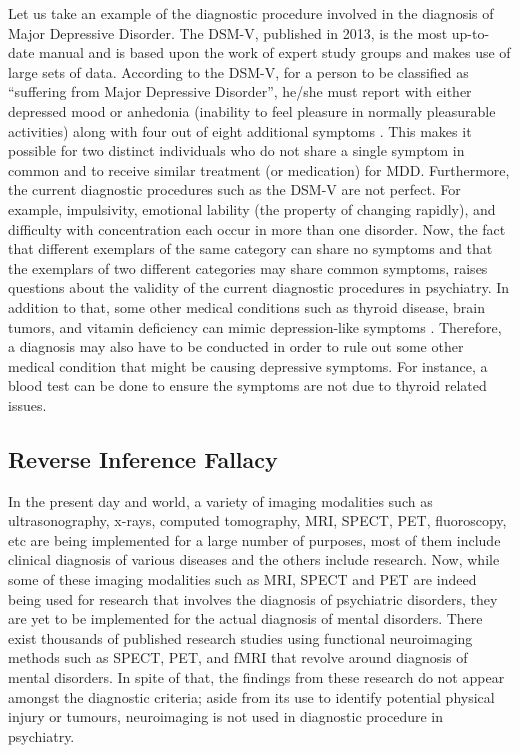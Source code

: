 \documentclass[12pt]{article}
\begin{document}
Let us take an example of the diagnostic procedure involved in the
diagnosis of Major Depressive Disorder. The DSM-V, published in 2013,
is the most up-to-date manual and is based upon the work of expert
study groups and makes use of large sets of data. According to the
DSM-V, for a person to be classified as ``suffering from Major
Depressive Disorder'', he/she must report with either depressed mood
or anhedonia (inability to feel pleasure in normally pleasurable
activities) along with four out of eight additional symptoms
\cite{diagnosticbrainimaging}. This makes it possible for two distinct
individuals who do not share a single symptom in common and to receive
similar treatment (or medication) for MDD. Furthermore, the current
diagnostic procedures such as the DSM-V are not perfect. For example,
impulsivity, emotional lability (the property of changing rapidly),
and difficulty with concentration each occur in more than one
disorder. Now, the fact that different exemplars of the same category
can share no symptoms and that the exemplars of two different
categories may share common symptoms, raises questions about the
validity of the current diagnostic procedures in psychiatry. In
addition to that, some other medical conditions such as thyroid
disease, brain tumors, and vitamin deficiency can mimic
depression-like symptoms \cite{externalfactorsinMDD}. Therefore,
a diagnosis may also have to be conducted in order to rule out some
other medical condition that might be causing depressive symptoms. For
instance, a blood test can be done to ensure the symptoms are not due
to thyroid related issues.

\subsection{Reverse Inference Fallacy}

In the present day and world, a variety of imaging modalities such as
ultrasonography, x-rays, computed tomography, MRI, SPECT, PET,
fluoroscopy, etc are being implemented for a large number of purposes,
most of them include clinical diagnosis of various diseases and the
others include research. Now, while some of these imaging modalities
such as MRI, SPECT and PET are indeed being used for research that
involves the diagnosis of psychiatric disorders, they are yet to be
implemented for the actual diagnosis of mental disorders. There exist
thousands of published research studies using functional neuroimaging
methods such as SPECT, PET, and fMRI that revolve around diagnosis of
mental disorders. In spite of that, the findings from these research
do not appear amongst the diagnostic criteria; aside from its use to
identify potential physical injury or tumours, neuroimaging is not
used in diagnostic procedure in psychiatry.
\end{document}
